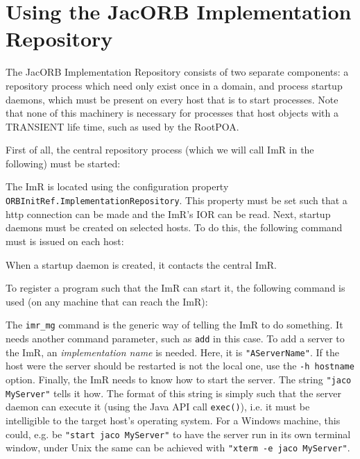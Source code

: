 \section{Using the JacORB Implementation Repository}

The  JacORB   Implementation  Repository  consists   of  two  separate
components:  a repository  process which  need  only exist  once in  a
domain, and  process startup daemons,  which must be present  on every
host that is  to start processes. Note that none  of this machinery is
necessary for processes that host  objects with a TRANSIENT life time,
such as used by the RootPOA.

First of all, the central repository process (which we will call ImR
in the following) must be started:


The   ImR   is  located   using   the   configuration  property   {\tt
ORBInitRef.ImplementationRepository}.  This property  must be set such
that  a  http  connection  can  be  made and  the  ImR's  IOR  can  be
read. Next, startup  daemons must be created on  selected hosts. To do
this, the following command must is issued on each host:


When a startup  daemon is created, it contacts  the central ImR.

To register  a program such that  the ImR can start  it, the following
command is used (on any machine that can reach the ImR):


The {\tt imr\_mg} command is the  generic way of telling the ImR to do
something. It  needs another command  parameter, such as {\tt  add} in
this case. To add a server to the ImR, an {\em implementation name} is
needed. Here, it is {\tt  "AServerName"}.  If the host were the server
should be  restarted is not the  local one, use the  {\tt -h hostname}
option.  Finally, the  ImR needs to know how to  start the server. The
string {\tt "jaco  MyServer"} tells it how. The  format of this string
is simply such  that the server daemon can execute  it (using the Java
API call  {\tt exec()}), i.e.  it  must be intelligible  to the target
host's operating system.   For a Windows machine, this  could, e.g. be
{\tt "start jaco MyServer"} to have the server run in its own terminal
window, under Unix  the same can be achieved with  {\tt "xterm -e jaco
MyServer"}.

